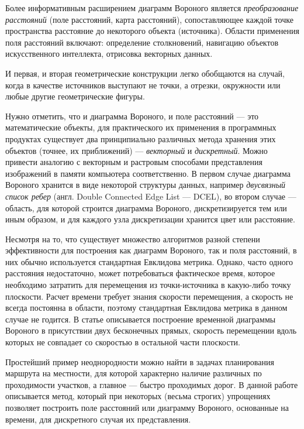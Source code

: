 \documentclass[12pt]{article}
\begin{document}
Более информативным расширением диаграмм Вороного является \emph{преобразование 
расстояний} (поле расстояний, карта расстояний), сопоставляющее каждой точке 
пространства расстояние до некоторого объекта (источника). Области применения 
поля расстояний включают: определение столкновений, навигацию объектов 
искусственного интеллекта, отрисовка векторных данных.

И первая, и вторая геометрические конструкции легко обобщаются на случай, когда 
в качестве источников выступают не точки, а отрезки, окружности или любые другие
геометрические фигуры.

Нужно отметить, что и диаграмма Вороного, и поле расстояний --- это 
математические объекты, для практического их применения в программных 
продуктах существует два принципиально различных метода хранения этих
объектов (точнее, их приближений) --- \emph{векторный} и \emph{дискретный}.
Можно привести аналогию с векторным и растровым способами представления 
изображений в памяти компьютера соответственно. В первом случае 
диаграмма Вороного хранится в виде некоторой структуры данных, например 
\emph{двусвязный список ребер} (англ. Double Connected Edge List --- DCEL),
во втором случае --- область, для которой строится диаграмма Вороного, 
дискретизируется тем или иным образом, и для каждого узла дискретизации хранится
цвет или расстояние.

Несмотря на то, что существует множество алгоритмов разной степени 
эффективности для построения как диаграмм Вороного, так и поля расстояний,
в них обычно используется стандартная Евклидова метрика. Однако, часто одного
расстояния недостаточно, может потребоваться фактическое время, которое 
необходимо затратить для перемещения из точки-источника в какую-либо точку
плоскости. Расчет времени требует знания скорости перемещения, а скорость не всегда постоянна
в области, поэтому стандартная Евклидова метрика в данном случае не годится.
В статье \cite{timeb} описывается построение временной 
диаграммы Вороного в присутствии двух бесконечных прямых, скорость перемещении
вдоль которых не совпадает со скоростью в остальной части плоскости.

Простейший пример неоднородности можно найти в задачах планирования маршрута
на местности, для которой характерно наличие различных по проходимости участков,
а главное --- быстро проходимых дорог. В данной работе описывается метод, 
который при некоторых (весьма строгих) упрощениях позволяет построить 
поле расстояний или диаграмму Вороного, основанные на времени,
для дискретного случая их представления.
\end{document}
